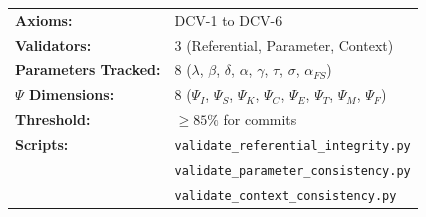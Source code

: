 \begin{abstract}
The Data Consistency Validation Framework (DCV) ensures integrity, consistency, and coherence across all EBF databases. With multiple interconnected data sources---model registries, theory catalogs, case studies, context factors, and bibliographic references---silent inconsistencies can accumulate and compromise analysis quality. This appendix formalizes six axioms (DCV-1 to DCV-6) that govern data validation, specifies canonical parameter ranges from behavioral economics literature, and defines the eight $\Psi$-dimension taxonomy for context validation. The framework is implemented through three automated validators that run on every commit, catching referential integrity violations, parameter drift, and context contradictions before they propagate through the system.
\end{abstract}

\begin{tcolorbox}[colback=yellow!10!white, colframe=orange!75!black, title=Quick Reference]
\begin{tabular}{ll}
\textbf{Axioms:} & DCV-1 to DCV-6 \\
\textbf{Validators:} & 3 (Referential, Parameter, Context) \\
\textbf{Parameters Tracked:} & 8 ($\lambda$, $\beta$, $\delta$, $\alpha$, $\gamma$, $\tau$, $\sigma$, $\alpha_{FS}$) \\
\textbf{$\Psi$ Dimensions:} & 8 ($\Psi_I$, $\Psi_S$, $\Psi_K$, $\Psi_C$, $\Psi_E$, $\Psi_T$, $\Psi_M$, $\Psi_F$) \\
\textbf{Threshold:} & $\geq 85\%$ for commits \\
\textbf{Scripts:} & \texttt{validate\_referential\_integrity.py} \\
                  & \texttt{validate\_parameter\_consistency.py} \\
                  & \texttt{validate\_context\_consistency.py} \\
\end{tabular}
\end{tcolorbox}

